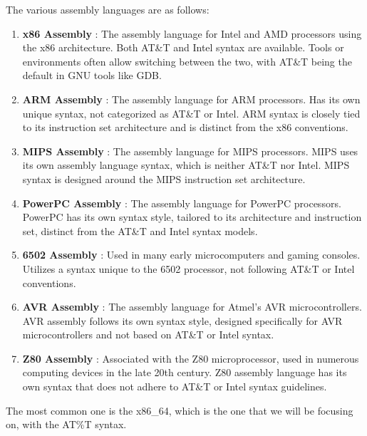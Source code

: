 \documentclass{article}
\begin{document}
  \begin{example}
    The various assembly languages are as follows: 
    \begin{enumerate}
      \item \textbf{x86 Assembly} : The assembly language for Intel and AMD processors using the x86 architecture. Both AT\&T and Intel syntax are available. Tools or environments often allow switching between the two, with AT\&T being the default in GNU tools like GDB.
      
      \item \textbf{ARM Assembly} : The assembly language for ARM processors. Has its own unique syntax, not categorized as AT\&T or Intel. ARM syntax is closely tied to its instruction set architecture and is distinct from the x86 conventions.
      
      \item \textbf{MIPS Assembly} : The assembly language for MIPS processors. MIPS uses its own assembly language syntax, which is neither AT\&T nor Intel. MIPS syntax is designed around the MIPS instruction set architecture.
      
      \item \textbf{PowerPC Assembly} : The assembly language for PowerPC processors. PowerPC has its own syntax style, tailored to its architecture and instruction set, distinct from the AT\&T and Intel syntax models.
      
      \item \textbf{6502 Assembly} : Used in many early microcomputers and gaming consoles. Utilizes a syntax unique to the 6502 processor, not following AT\&T or Intel conventions.
      
      \item \textbf{AVR Assembly} : The assembly language for Atmel's AVR microcontrollers. AVR assembly follows its own syntax style, designed specifically for AVR microcontrollers and not based on AT\&T or Intel syntax.
      
      \item \textbf{Z80 Assembly} : Associated with the Z80 microprocessor, used in numerous computing devices in the late 20th century. Z80 assembly language has its own syntax that does not adhere to AT\&T or Intel syntax guidelines.
    \end{enumerate}
  \end{example}

  The most common one is the x86\_64, which is the one that we will be focusing on, with the AT\%T syntax. 
\end{document}
